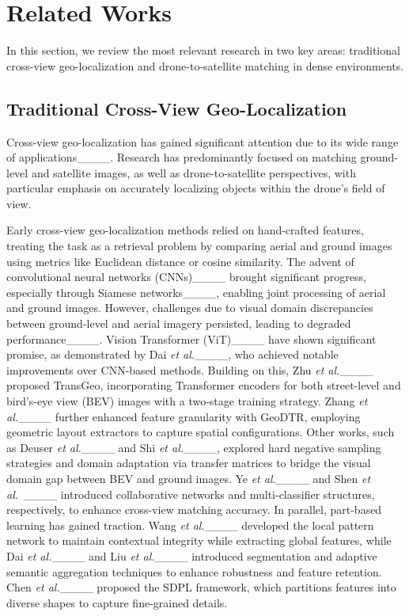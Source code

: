 \section{Related Works}
\label{Related Works}
In this section, we review the most relevant research in two key areas: traditional cross-view geo-localization and drone-to-satellite matching in dense environments.

\subsection{Traditional Cross-View Geo-Localization}
Cross-view geo-localization has gained significant attention due to its wide range of applications____.
Research has predominantly focused on matching ground-level and satellite images, as well as drone-to-satellite perspectives, with particular emphasis on accurately localizing objects within the drone's field of view.

Early cross-view geo-localization methods relied on hand-crafted features, treating the task as a retrieval problem by comparing aerial and ground images using metrics like Euclidean distance or cosine similarity. The advent of convolutional neural networks (CNNs)____ brought significant progress, especially through Siamese networks____, enabling joint processing of aerial and ground images.
However, challenges due to visual domain discrepancies between ground-level and aerial imagery persisted, leading to degraded performance____.
Vision Transformer (ViT)____ have shown significant promise, as demonstrated by Dai \textit{et al.}____, who achieved notable improvements over CNN-based methods. Building on this, Zhu \textit{et al.}____ proposed TransGeo, incorporating Transformer encoders for both street-level and bird's-eye view (BEV) images with a two-stage training strategy. Zhang \textit{et al.}____ further enhanced feature granularity with GeoDTR, employing geometric layout extractors to capture spatial configurations. Other works, such as Deuser \textit{et al.}____ and Shi \textit{et al.}____, explored hard negative sampling strategies and domain adaptation via transfer matrices to bridge the visual domain gap between BEV and ground images. Ye \textit{et al.}____ and Shen \textit{et al.}~____ introduced collaborative networks and multi-classifier structures, respectively, to enhance cross-view matching accuracy.
In parallel, part-based learning has gained traction. Wang \textit{et al.}____ developed the local pattern network to maintain contextual integrity while extracting global features, while Dai \textit{et al.}____ and Liu \textit{et al.}____ introduced segmentation and adaptive semantic aggregation techniques to enhance robustness and feature retention. Chen \textit{et al.}____ proposed the SDPL framework, which partitions features into diverse shapes to capture fine-grained details.

